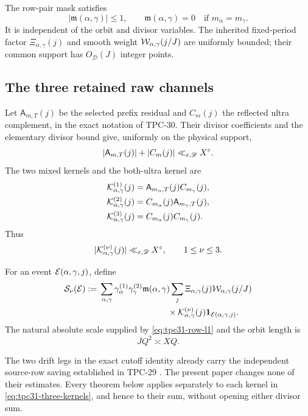 The row-pair mask satisfies
\begin{equation}
 |\mathfrak m(\alpha,\gamma)|\le1,
 \qquad
 \mathfrak m(\alpha,\gamma)=0
 \quad\text{if }m_\alpha=m_\gamma.
 \label{eq:tpc31-off-diagonal-mask}
\end{equation}
It is independent of the orbit and divisor variables.  The inherited
fixed-period factor $\Xi_{\alpha,\gamma}(j)$ and smooth weight
$\mathcal W_{\alpha,\gamma}(j/J)$ are uniformly bounded; their common
support has $O_{\mathscr D}(J)$ integer points.

\subsection{The three retained raw channels}

Let $\mathsf A_{m,T}(j)$ be the selected prefix residual and
$C_m(j)$ the reflected ultra complement, in the exact notation of
TPC-30.  Their divisor coefficients and the elementary divisor bound
give, uniformly on the physical support,
\begin{equation}
 |\mathsf A_{m,T}(j)|+|C_m(j)|
 \ll_{\varepsilon,\mathscr D}X^\varepsilon.
 \label{eq:tpc31-pointwise-prefix-complement}
\end{equation}
The two mixed kernels and the both-ultra kernel are
\begin{align}
 \mathcal K^{(1)}_{\alpha,\gamma}(j)
 &=\mathsf A_{m_\alpha,T}(j)C_{m_\gamma}(j),
 \notag\\
 \mathcal K^{(2)}_{\alpha,\gamma}(j)
 &=C_{m_\alpha}(j)\mathsf A_{m_\gamma,T}(j),
 \label{eq:tpc31-three-kernels}\\
 \mathcal K^{(3)}_{\alpha,\gamma}(j)
 &=C_{m_\alpha}(j)C_{m_\gamma}(j).
 \notag
\end{align}
Thus
\begin{equation}
 |\mathcal K^{(\nu)}_{\alpha,\gamma}(j)|
 \ll_{\varepsilon,\mathscr D}X^\varepsilon,
 \qquad 1\le\nu\le3.
 \label{eq:tpc31-kernel-envelope}
\end{equation}

For an event $\mathcal E(\alpha,\gamma,j)$, define
\begin{align}
 \mathcal S_\nu(\mathcal E)
 :={}&\sum_{\alpha,\gamma}
 \gamma_\alpha^{(1)}\gamma_\gamma^{(2)}
 \mathfrak m(\alpha,\gamma)
 \sum_j\Xi_{\alpha,\gamma}(j)
 \mathcal W_{\alpha,\gamma}(j/J)
 \notag\\
 &\hspace{8em}\times
 \mathcal K^{(\nu)}_{\alpha,\gamma}(j)
 \mathbf 1_{\mathcal E(\alpha,\gamma,j)}.
 \label{eq:tpc31-raw-channel}
\end{align}
The natural absolute scale supplied by
\eqref{eq:tpc31-row-l1} and the orbit length is
\begin{equation}
 JQ^2\asymp XQ.
 \label{eq:tpc31-natural-scale}
\end{equation}

The two drift legs in the exact cutoff identity already carry the
independent source-row saving established in TPC-29
\citep{WangTPC29}.  The present
paper changes none of their estimates.  Every theorem below applies
separately to each kernel in \eqref{eq:tpc31-three-kernels}, and hence
to their sum, without opening either divisor sum.
